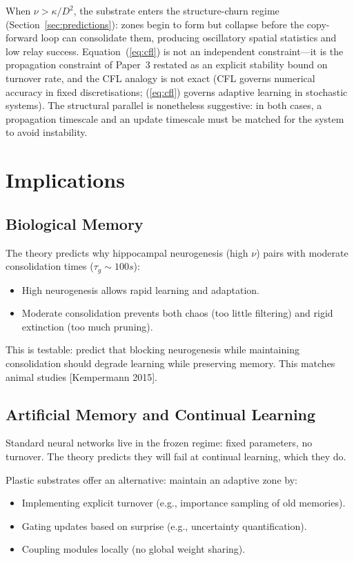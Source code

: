\documentclass[11pt]{article}
\begin{document}
When $\nu > \kappa/D^2$, the substrate enters the structure-churn regime (Section~\ref{sec:predictions}): zones begin to form but collapse before the copy-forward loop can consolidate them, producing oscillatory spatial statistics and low relay success.
Equation~(\ref{eq:cfl}) is not an independent constraint---it is the propagation constraint of Paper~3 restated as an explicit stability bound on turnover rate, and the CFL analogy is not exact (CFL governs numerical accuracy in fixed discretisations; (\ref{eq:cfl}) governs adaptive learning in stochastic systems).
The structural parallel is nonetheless suggestive: in both cases, a propagation timescale and an update timescale must be matched for the system to avoid instability.

\section{Implications}

\subsection{Biological Memory}

The theory predicts why hippocampal neurogenesis (high $\nu$) pairs with moderate consolidation times ($\tau_g \sim 100s$):
\begin{itemize}
\item High neurogenesis allows rapid learning and adaptation.
\item Moderate consolidation prevents both chaos (too little filtering) and rigid extinction (too much pruning).
\end{itemize}

This is testable: predict that blocking neurogenesis while maintaining consolidation should degrade learning while preserving memory. This matches animal studies [Kempermann 2015].

\subsection{Artificial Memory and Continual Learning}

Standard neural networks live in the frozen regime: fixed parameters, no turnover. The theory predicts they will fail at continual learning, which they do.

Plastic substrates offer an alternative: maintain an adaptive zone by:
\begin{itemize}
\item Implementing explicit turnover (e.g., importance sampling of old memories).
\item Gating updates based on surprise (e.g., uncertainty quantification).
\item Coupling modules locally (no global weight sharing).
\end{itemize}
\end{document}
